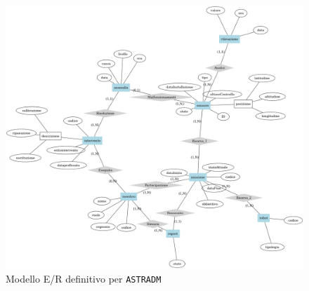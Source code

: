 \begin{figure}[ht]
  \centering
  \includegraphics[width=\linewidth]{images/er.png}
  \caption{Modello E/R definitivo per \texttt{ASTRADM}}
  \label{fig:er}
\end{figure}


